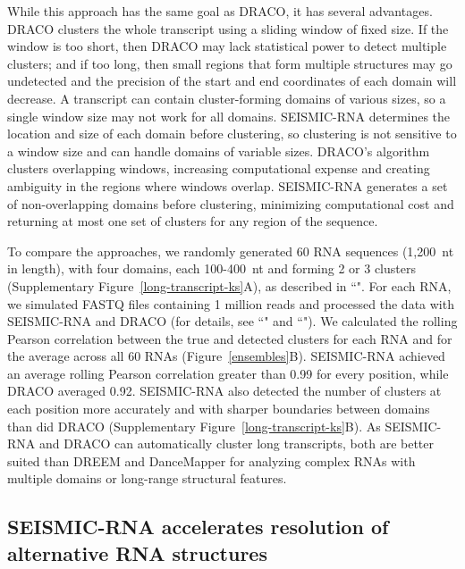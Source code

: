 \documentclass[11pt]{article}
\begin{document}
While this approach has the same goal as DRACO, it has several advantages.
DRACO clusters the whole transcript using a sliding window of fixed size.
If the window is too short, then DRACO may lack statistical power to detect multiple clusters; and if too long, then small regions that form multiple structures may go undetected and the precision of the start and end coordinates of each domain will decrease.
A transcript can contain cluster-forming domains of various sizes, so a single window size may not work for all domains.
SEISMIC-RNA determines the location and size of each domain before clustering, so clustering is not sensitive to a window size and can handle domains of variable sizes.
DRACO's algorithm clusters overlapping windows, increasing computational expense and creating ambiguity in the regions where windows overlap.
SEISMIC-RNA generates a set of non-overlapping domains before clustering, minimizing computational cost and returning at most one set of clusters for any region of the sequence.

To compare the approaches, we randomly generated 60 RNA sequences (1,200~nt in length), with four domains, each 100-400~nt and forming 2 or 3 clusters (Supplementary Figure~\ref{long-transcript-ks}A), as described in ``".
For each RNA, we simulated FASTQ files containing 1 million reads and processed the data with SEISMIC-RNA and DRACO (for details, see ``" and ``").
We calculated the rolling Pearson correlation between the true and detected clusters for each RNA and for the average across all 60 RNAs (Figure~\ref{ensembles}B).
SEISMIC-RNA achieved an average rolling Pearson correlation greater than 0.99 for every position, while DRACO averaged 0.92.
SEISMIC-RNA also detected the number of clusters at each position more accurately and with sharper boundaries between domains than did DRACO (Supplementary Figure~\ref{long-transcript-ks}B).
As SEISMIC-RNA and DRACO can automatically cluster long transcripts, both are better suited than DREEM and DanceMapper for analyzing complex RNAs with multiple domains or long-range structural features.


\subsection{SEISMIC-RNA accelerates resolution of alternative RNA structures}
\end{document}
